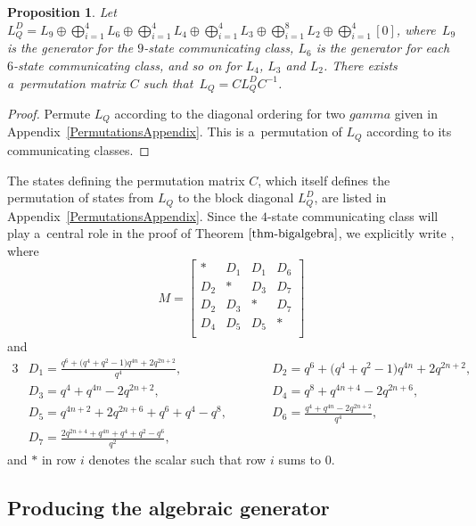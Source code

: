 \documentclass[10pt,a4paper]{amsart}
\numberwithin{equation}{section}
\newtheorem{Proposition}[Theorem]{Proposition}
\theoremstyle{definition}
\def\mathcal#1{#1}
\def\gamma{gamma}
\begin{document}
\begin{Proposition}
\label{DiagonalBlockOrdering}
Let $L^D_Q = \mathcal{L}_9 \oplus \bigoplus_{i=1}^4 \mathcal{L}_6 \oplus \bigoplus_{i=1}^4 \mathcal{L}_4 \oplus \bigoplus_{i=1}^4 \mathcal{L}_3 \oplus \bigoplus_{i=1}^8 \mathcal{L}_2 \oplus \bigoplus_{i=1}^4 [0]$, where~$\mathcal{L}_9$ is the generator for the $9$-state communicating class, $\mathcal{L}_6$ is the generator for each $6$-state communicating class, and so on for $\mathcal{L}_4$, $\mathcal{L}_3$ and $\mathcal{L}_2$. There exists a~permutation matrix $C$ such that~${L_Q = CL^D_QC^{-1}}$.
\end{Proposition}
\begin{proof} \label{DiagonalBlockOrderingProof}
 Permute $L_Q$ according to the diagonal ordering for two $\gamma$ given in Appendix~\ref{PermutationsAppendix}. This is a~permutation of $L_Q$ according to its communicating classes.
\end{proof}

The states defining the permutation matrix $C$, which itself defines the permutation of states from $L_Q$ to the block diagonal $L^D_Q$, are listed in Appendix~\ref{PermutationsAppendix}.
Since the $4$-state communicating class will play a~central role in the proof of Theorem $\ref{thm-bigalgebra}$, we explicitly write
\smash{$\mathcal{L}_4 = \frac{1}{(q^4+2q^2+1)q^{2n}}M$},
where
\[M =
\left[
\begin{matrix}
 * & D_1 & D_1 & D_6\\
 D_2 & * & D_3 & D_7\\
 D_2 & D_3 & * & D_7\\
 D_4 & D_5 & D_5 & * \\
\end{matrix}
\right]
\]
and
\begin{alignat*}{3}
& D_1 = \frac{q^6+\bigl(q^4+q^2-1\bigr)q^{4n}+2q^{2n+2}}{q^4}, \qquad &&
 D_2 = q^6+\bigl(q^4+q^2-1\bigr)q^{4n}+2q^{2n+2},& \\
& D_3 = q^4+q^{4n}-2q^{2n+2},\qquad&&
 D_4 = q^8+q^{4n+4}-2q^{2n+6},& \\
& D_5 = q^{4n+2}+2q^{2n+6}+q^6+q^4-q^8,\qquad&&
 D_6 = \frac{q^4+q^{4n}-2q^{2n+2}}{q^4},&\\
 &D_7 = \frac{2q^{2n+4}+q^{4n}+q^4+q^2-q^6}{q^2},&&&
\end{alignat*}
and $*$ in row $i$ denotes the scalar such that row $i$ sums to 0.

\subsection{Producing the algebraic generator} \label{section--AlgebraGenerator}
\end{document}
